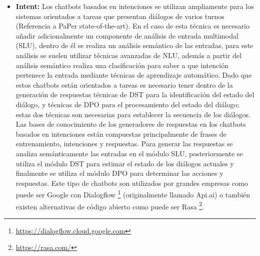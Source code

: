 \begin{itemize}
    \item \textbf{Intent:} Los chatbots basados en intenciones se utilizan ampliamente para los sistemas orientados a tareas que presentan diálogos de varios turnos (Referencia a PaPer state-of-the-art). En el caso de esta técnica es necesario añadir adicionalmente un componente de análisis de entrada multimodal (SLU), dentro de él se realiza un análisis semántico de las entradas, para este análisis se suelen utilizar técnicas avanzadas de NLU, además a partir del análisis semántico realiza una clasificación para saber a que intención pertenece la entrada mediante técnicas de aprendizaje automático. Dado que estos chatbots están orientados a tareas es necesario tener dentro de la generación de respuestas técnicas de DST para la identificación del estado del diálogo, y técnicas de DPO para el procesamiento del estado del diálogo; estas dos técnicas son necesarias para establecer la secuencia de los diálogos. Las bases de conocimiento de los generadores de respuestas en los chatbots basados en intenciones están compuestas principalmente de frases de entrenamiento, intenciones y respuestas. Para generar las respuestas se analiza semánticamente las entradas en el módulo SLU, posteriormente se utiliza el módulo DST para estimar el estado de los diálogos actuales y finalmente se utiliza el módulo DPO para determinar las acciones y respuestas. Este tipo de chatbots son utilizados por grandes empresas como puede ser Google con Dialogflow \footnote{\url{https://dialogflow.cloud.google.com}} (originalmente llamado Api.ai) o también existen alternativas de código abierto como puede ser Rasa \footnote{\url{https://rasa.com/}}.

\end{itemize}
